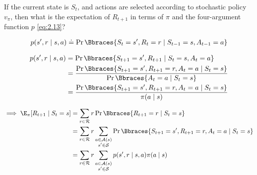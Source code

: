 
\begin{exercise}[Exercise 3.11]

If the current state is $S_t$, and actions are selected according to stochastic policy $v_\pi$, then what is the expectation of $R_{t+1}$ in terms of $\pi$ and the four-argument function $p$ \eqref{eq:2.13}?

\begin{align} \label{eq:2.13}
    p(s^\prime, r \mid s, a)
    \doteq
    \Pr \Bbraces{S_t = s^\prime, R_t = r \mid S_{t-1} = s, A_{t-1} = a}
\end{align}

\end{exercise}


\begin{solution}

\begin{align*}
    p(s^\prime, r \mid s, a)
    & =
    \Pr \Bbraces{S_{t+1} = s^\prime, R_{t+1} \mid S_t = s, A_t = a} \\
    & =
    \frac
    {
        \Pr \Bbraces{S_{t+1} = s^\prime, R_{t+1} = r, A_t = a \mid S_t = s}
    }{
        \Pr \Bbraces{A_t = a \mid S_t = s}
    } \\
    & =
    \frac
    {
        \Pr \Bbraces{S_{t+1} = s^\prime, R_{t+1} = r, A_t = a \mid S_t = s}
    }{
        \pi(a \mid s)
    }
\end{align*}

\begin{align*}
    \implies
    \E_\pi[R_{t+1} \mid S_t = s]
    & =
    \sum_{r \in \mathcal R}
        r
        \Pr \Bbraces{R_{t+1} = r \mid S_t = s} \\
    & =
    \sum_{r \in \mathcal R}
        r
        \sum_{\substack{a \in \mathcal A(s) \\ s^\prime \in \mathcal S}}
            \Pr \Bbraces{S_{t+1} = s^\prime, R_{t+1} = r, A_t = a \mid S_t = s} \\
    & =
    \sum_{r \in \mathcal R}
        r
        \sum_{\substack{a \in \mathcal A(s) \\ s^\prime \in \mathcal S}}
            p(s^\prime, r \mid s, a) \pi(a \mid s)
\end{align*}

\end{solution}

